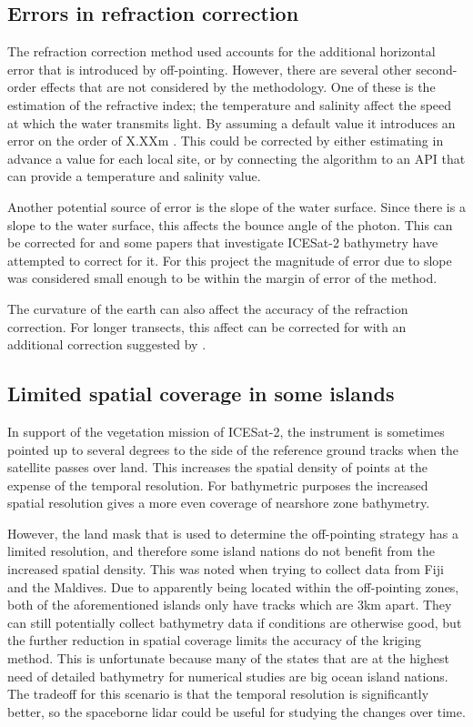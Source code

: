 \subsection{Errors in refraction correction}

The refraction correction method used accounts for the additional horizontal error that is introduced by off-pointing. However, there are several other second-order effects that are not considered by the methodology. One of these is the estimation of the refractive index; the temperature and salinity affect the speed at which the water transmits light. By assuming a default value it introduces an error on the order of X.XXm . This could be corrected by either estimating in advance a value for each local site, or by connecting the algorithm to an API that can provide a temperature and salinity value. 

Another potential source of error is the slope of the water surface. Since there is a slope to the water surface, this affects the bounce angle of the photon. This can be corrected for and some papers that investigate ICESat-2 bathymetry have attempted to correct for it. For this project the magnitude of error due to slope was considered small enough to be within the margin of error of the method.

The curvature of the earth can also affect the accuracy of the refraction correction. For longer transects, this affect can be corrected for with an additional correction suggested by \citeauthor{Parrish2019}. 

\subsection{Limited spatial coverage in some islands}

In support of the vegetation mission of ICESat-2, the instrument is sometimes pointed up to several degrees to the side of the reference ground tracks when the satellite passes over land. This increases the spatial density of points at the expense of the temporal resolution. For bathymetric purposes the increased spatial resolution gives a more even  coverage of nearshore zone bathymetry. 

However, the land mask that is used to determine the off-pointing strategy has a limited resolution, and therefore some island nations do not benefit from the increased spatial density. This was noted when trying to collect data from Fiji and the Maldives. Due to apparently being located within the off-pointing zones, both of the aforementioned islands only have tracks which are 3km apart. They can still potentially collect bathymetry data if conditions are otherwise good, but the further reduction in spatial coverage limits the accuracy of the kriging method. This is unfortunate because many of the states that are at the highest need of detailed bathymetry for numerical studies are big ocean island nations. The tradeoff for this scenario is that the temporal resolution is significantly better, so the spaceborne lidar could be useful for studying the changes over time. 

